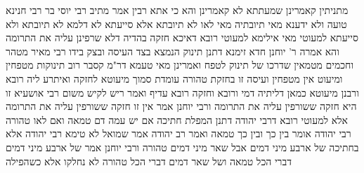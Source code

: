 \documentclass[12pt, openany]{book}
\begin{document}
{מתניתין קאמרינן שמעתתא לא קאמרינן 
והא כי אתא רבין אמר מתיב רבי יוסי בר רבי חנינא טועה ולא ידענא מאי תיובתיה
מאי לאו לא תיובתא אלא סייעתא 
לא דלמא לא תיובתא ולא סייעתא 
למעוטי מאי 
אילימא למעוטי רובא דאיכא חזקה בהדיה דלא שרפינן עליה את התרומה והא אמרה ר' יוחנן חדא זימנא 
דתנן תינוק הנמצא בצד העיסה ובצק בידו רבי מאיר מטהר וחכמים מטמאין שדרכו של תינוק לטפח 
ואמרינן מאי טעמא דר"מ קסבר רוב תינוקות מטפחין ומיעוט אין מטפחין ועיסה זו בחזקת טהורה עומדת סמוך מיעוטא לחזקה ואיתרע ליה רובא 
ורבנן מיעוטא כמאן דליתיה דמי ורובא וחזקה רובא עדיף 
ואמר ריש לקיש משום רבי אושעיא זו היא חזקה ששורפין עליה את התרומה ורבי יוחנן אמר אין זו חזקה ששורפין עליה את התרומה 
אלא למעוטי רובא דרבי יהודה דתנן המפלת חתיכה אם יש עמה דם טמאה ואם לאו טהורה רבי יהודה אומר בין כך ובין כך טמאה 
ואמר רב יהודה אמר שמואל לא טימא רבי יהודה אלא בחתיכה של ארבע מיני דמים אבל שאר מיני דמים טהורה ורבי יוחנן אמר של ארבע מיני דמים דברי הכל טמאה ושל שאר דמים דברי הכל טהורה לא נחלקו אלא כשהפילה}
\end{document}
